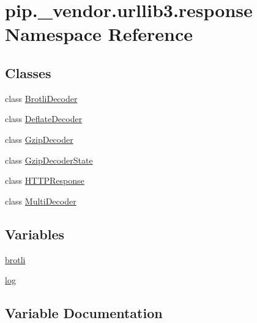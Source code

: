 \hypertarget{namespacepip_1_1__vendor_1_1urllib3_1_1response}{}\section{pip.\+\_\+vendor.\+urllib3.\+response Namespace Reference}
\label{namespacepip_1_1__vendor_1_1urllib3_1_1response}
\subsection*{Classes}
\begin{DoxyCompactItemize}
\item 
class \hyperlink{classpip_1_1__vendor_1_1urllib3_1_1response_1_1BrotliDecoder}{Brotli\+Decoder}
\item 
class \hyperlink{classpip_1_1__vendor_1_1urllib3_1_1response_1_1DeflateDecoder}{Deflate\+Decoder}
\item 
class \hyperlink{classpip_1_1__vendor_1_1urllib3_1_1response_1_1GzipDecoder}{Gzip\+Decoder}
\item 
class \hyperlink{classpip_1_1__vendor_1_1urllib3_1_1response_1_1GzipDecoderState}{Gzip\+Decoder\+State}
\item 
class \hyperlink{classpip_1_1__vendor_1_1urllib3_1_1response_1_1HTTPResponse}{H\+T\+T\+P\+Response}
\item 
class \hyperlink{classpip_1_1__vendor_1_1urllib3_1_1response_1_1MultiDecoder}{Multi\+Decoder}
\end{DoxyCompactItemize}
\subsection*{Variables}
\begin{DoxyCompactItemize}
\item 
\hyperlink{namespacepip_1_1__vendor_1_1urllib3_1_1response_a89012e4c3828bd7142edc6396d2acaf6}{brotli}
\item 
\hyperlink{namespacepip_1_1__vendor_1_1urllib3_1_1response_a6a0fca8b74059eb3768d5525d270f367}{log}
\end{DoxyCompactItemize}


\subsection{Variable Documentation}
\mbox{\label{namespacepip_1_1__vendor_1_1urllib3_1_1response_a89012e4c3828bd7142edc6396d2acaf6}} 
